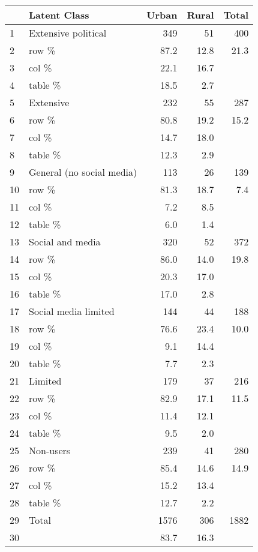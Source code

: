 \documentclass{article}
\begin{document}
\begin{table}[ht]
\centering
\begin{tabular}{llrrr}
  \hline
 & Latent Class & Urban & Rural & Total \\ 
  \hline
1 & Extensive political & 349 & 51 & 400 \\ 
  2 & row \% & 87.2 & 12.8 & 21.3 \\ 
  3 & col \% & 22.1 & 16.7 &  \\ 
  4 & table \% & 18.5 & 2.7 &  \\ 
  5 & Extensive & 232 & 55 & 287 \\ 
  6 & row \% & 80.8 & 19.2 & 15.2 \\ 
  7 & col \% & 14.7 & 18.0 &  \\ 
  8 & table \% & 12.3 & 2.9 &  \\ 
  9 & General (no social media) & 113 & 26 & 139 \\ 
  10 & row \% & 81.3 & 18.7 & 7.4 \\ 
  11 & col \% & 7.2 & 8.5 &  \\ 
  12 & table \% & 6.0 & 1.4 &  \\ 
  13 & Social and media & 320 & 52 & 372 \\ 
  14 & row \% & 86.0 & 14.0 & 19.8 \\ 
  15 & col \% & 20.3 & 17.0 &  \\ 
  16 & table \% & 17.0 & 2.8 &  \\ 
  17 & Social media limited & 144 & 44 & 188 \\ 
  18 & row \% & 76.6 & 23.4 & 10.0 \\ 
  19 & col \% & 9.1 & 14.4 &  \\ 
  20 & table \% & 7.7 & 2.3 &  \\ 
  21 & Limited & 179 & 37 & 216 \\ 
  22 & row \% & 82.9 & 17.1 & 11.5 \\ 
  23 & col \% & 11.4 & 12.1 &  \\ 
  24 & table \% & 9.5 & 2.0 &  \\ 
  25 & Non-users & 239 & 41 & 280 \\ 
  26 & row \% & 85.4 & 14.6 & 14.9 \\ 
  27 & col \% & 15.2 & 13.4 &  \\ 
  28 & table \% & 12.7 & 2.2 &  \\ 
  29 & Total & 1576 & 306 & 1882 \\ 
  30 &  & 83.7 & 16.3 &  \\ 
   \hline
\end{tabular}
\end{table}
\end{document}

